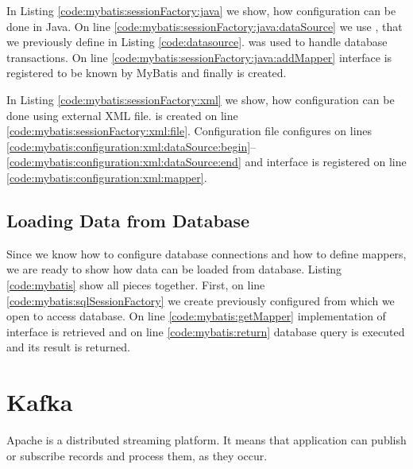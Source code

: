 In Listing \ref{code:mybatis:sessionFactory:java} we show, how configuration can be
done in Java. On line \ref{code:mybatis:sessionFactory:java:dataSource} we use ,
that we previously define in Listing \ref{code:datasource}.
 was used to handle database transactions.
On line \ref{code:mybatis:sessionFactory:java:addMapper}  interface is registered
to be known by MyBatis and finally  is created.


In Listing \ref{code:mybatis:sessionFactory:xml} we show, how configuration can be
done using external XML file.  is created
on line \ref{code:mybatis:sessionFactory:xml:file}. Configuration file
configures  on lines
\ref{code:mybatis:configuration:xml:dataSource:begin}--\ref{code:mybatis:configuration:xml:dataSource:end}
and  interface is registered on line \ref{code:mybatis:configuration:xml:mapper}.





\subsection{Loading Data from Database \label{frameworks:myBatis:run}}

Since we know how to configure database connections and how to define mappers,
we are ready to show how data can be loaded from database.
Listing \ref{code:mybatis} show all pieces together. First, on line
\ref{code:mybatis:sqlSessionFactory} we create previously configured
 from which we open  to
access database. On line \ref{code:mybatis:getMapper} implementation
of  interface is retrieved and on line \ref{code:mybatis:return}
database query is executed and its result is returned. 




\section{Kafka \label{frameworks:kafka}}

Apache \citet{Kafka} is a distributed streaming platform.
It means that application can publish or subscribe records and
process them, as they occur.

